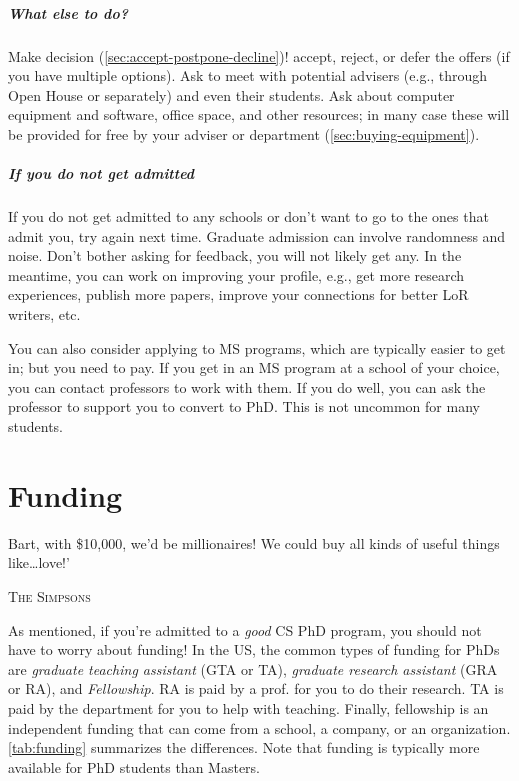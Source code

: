 \documentclass[oneside,11pt]{memoir}
\begin{document}
\paragraph{What else to do?} Make decision (\autoref{sec:accept-postpone-decline})! accept, reject, or defer the offers (if you have multiple options). Ask to meet with potential advisers (e.g., through Open House or separately) and even their students. Ask about computer equipment and software, office space, and other resources; in many case these will be provided for free by your adviser or department (\autoref{sec:buying-equipment}). 

\paragraph{If you do not get admitted} If you do not get admitted to any schools or don't want to go to the ones that admit you, try again next time.  Graduate admission can involve randomness and noise.  Don't bother asking for feedback, you will not likely get any.  In the meantime, you can work on improving your profile, e.g., get more research experiences, publish more papers, improve your connections for better LoR writers, etc.

You can also consider applying to MS programs, which are typically easier to get in; but you need to pay.  If you get in an MS program at a school of your choice, you can contact professors to work with them. If you do well, you can ask the professor to support you to convert to PhD.  This is not uncommon for many students.



\chapter{Funding}\label{sec:funding}

\epigraph{Bart, with \$10,000, we’d be millionaires! We could buy all kinds of useful things like…love!’}{\textsc{The Simpsons}}

As mentioned, if you're admitted to a \emph{good} CS PhD program, you should not have to worry about funding!  
In the US, the common types of funding for PhDs are \emph{graduate teaching assistant} (GTA or TA), \emph{graduate research assistant} (GRA or RA), and \emph{Fellowship}.
RA is paid by a prof. for you to do their research. TA is paid by the department for you to help with teaching. Finally, fellowship is an independent funding that can come from a school, a company, or an organization. \autoref{tab:funding} summarizes the differences.
Note that funding is typically more available for PhD students than 
Masters.
\end{document}
